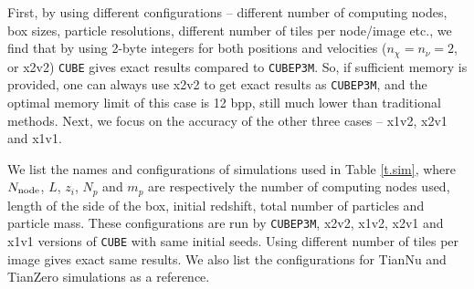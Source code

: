 \documentclass[10pt,twocolumn,preprint]{emulateapj}
\begin{document}
First, by using different configurations -- different number of computing nodes, box sizes, particle resolutions, different number of tiles per node/image etc., we find that by using 2-byte integers for both positions and velocities ($n_\chi=n_\nu=2$, or x2v2) {\tt CUBE} gives exact results compared to {\tt CUBEP3M}. So, if sufficient memory is provided, one can always use x2v2 to get exact results as {\tt CUBEP3M}, and the optimal memory limit of this case is 12 bpp, still much lower than traditional methods. Next, we focus on the accuracy of the other three cases -- x1v2, x2v1 and x1v1.

We list the names and configurations of simulations used in Table \ref{t.sim}, where $N_{\rm node}$, $L$, $z_i$, $N_p$ and $m_p$ are respectively the number of computing nodes used, length of the side of the box, initial redshift, total number of particles and particle mass. These configurations are run by {\tt CUBEP3M}, x2v2, x1v2, x2v1 and x1v1 versions of {\tt CUBE} with same initial seeds. Using different number of tiles per image gives exact same results. We also list the configurations for TianNu and TianZero \citep{2017NatAs...1E.143Y,2017RAA....17...85E} simulations as a reference.
\end{document}
